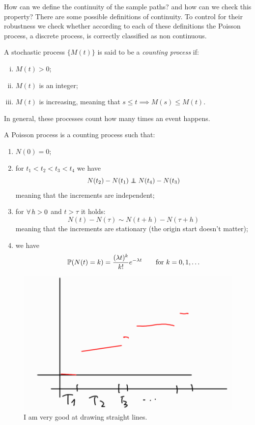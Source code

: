 \documentclass{report}
\begin{document}
	How can we define the continuity of the sample paths? and how can we check this property? There are some possible definitions of continuity. To control for their robustness we check whether according to each of these definitions the Poisson process, a discrete process, is correctly classified as non continuous.
	\begin{definition}
		A stochastic process $\{M(t)\}$ is said to be a \emph{counting process} if:
		\begin{enumerate}[i.]
			\item $M(t)>0$;
			\item $M(t)$ is an integer;
			\item $M(t)$ is increasing, meaning that $s\leq t\implies M(s)\leq M(t)$.
		\end{enumerate}
	\end{definition}
	In general, these processes count how many times an event happens.
	\begin{definition}
		A Poisson process is a counting process such that:
		\begin{enumerate}
			\item $N(0)=0$;
			\item for $t_1<t_2<t_3<t_4$ we have
			\begin{equation*}
				N(t_2)-N(t_1)\independent N(t_4)-N(t_3)
			\end{equation*}
			meaning that the increments are independent;
			\item for $\forall\, h>0$ and $t>\tau$ it holds:
			\begin{equation*}
				N(t)-N(\tau)\sim N(t+h)-N(\tau+h)
			\end{equation*}
			meaning that the increments are stationary (the origin start doesn't matter);
			\item we have $$\mathbb{P}(N(t)=k)=\frac{(\lambda t)^{k}}{k!}e^{-\lambda t}\qquad\text{for } k=0,1,\ldots$$
		\end{enumerate}
	\end{definition}
	\begin{figure}[h]
		\centering
		\includegraphics[width=0.7\linewidth]{img/screenshot002}
		\caption{I am very good at drawing straight lines.}
		\label{fig:screenshot002}
	\end{figure}
	
\end{document}
